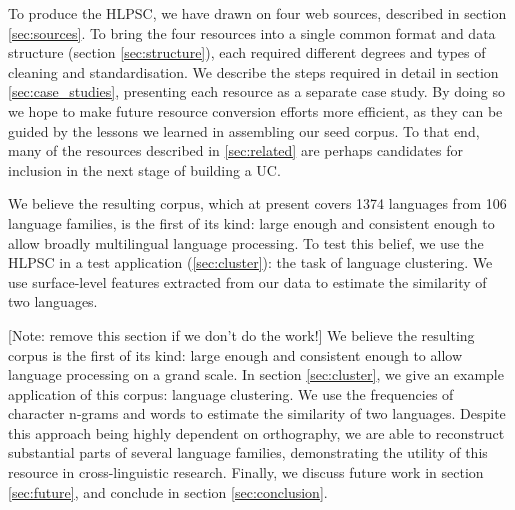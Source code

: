 To produce the HLPSC, we have drawn on four web sources, described in section \ref{sec:sources}. To bring the four resources into a single common format and data structure (section \ref{sec:structure}), each required different degrees and types of cleaning and standardisation. We describe the steps required in detail in section \ref{sec:case_studies}, presenting each resource as a separate case study. By doing so we hope to make future resource conversion efforts more efficient, as they can be guided by the lessons we learned in assembling our seed corpus. To that end, many of the resources described in \ref{sec:related} are perhaps candidates for inclusion in the next stage of building a UC.

We believe the resulting corpus, which at present covers 1374 languages from 106 language families, is the first of its kind: large enough and consistent enough to allow broadly multilingual language processing. To test this belief, we use the HLPSC in a test application (\ref{sec:cluster}): the task of language clustering. We use surface-level features extracted from our data to estimate the similarity of two languages. 


[Note: remove this section if we don't do the work!] We believe the resulting corpus is the first of its kind: large enough and consistent enough to allow language processing on a grand scale. In section \ref{sec:cluster}, we give an example application of this corpus: language clustering. We use the frequencies of character n-grams and words to estimate the similarity of two languages. Despite this approach being highly dependent on orthography, we are able to reconstruct substantial parts of several language families, demonstrating the utility of this resource in cross-linguistic research. Finally, we discuss future work in section \ref{sec:future}, and conclude in section \ref{sec:conclusion}.

